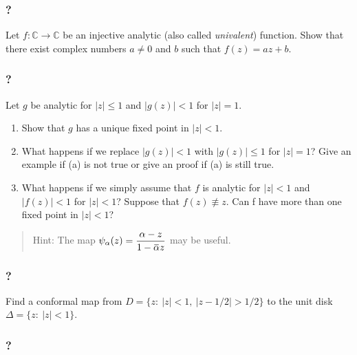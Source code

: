 \hypertarget{section-96}{%
\subsubsection{?}\label{section-96}}

Let \(f: {\mathbb C} \rightarrow {\mathbb C}\) be an injective analytic
(also called \emph{univalent}) function. Show that there exist complex
numbers \(a \neq 0\) and \(b\) such that \(f(z) = az + b\).

\hypertarget{section-97}{%
\subsubsection{?}\label{section-97}}

Let \(g\) be analytic for \(|z|\leq 1\) and \(|g(z)| < 1\) for
\(|z| = 1\).

\begin{enumerate}
\def\labelenumi{\arabic{enumi}.}
\item
  Show that \(g\) has a unique fixed point in \(|z| < 1\).
\item
  What happens if we replace \(|g(z)| < 1\) with \(|g(z)|\leq 1\) for
  \(|z|=1\)? Give an example if (a) is not true or give an proof if (a)
  is still true.
\item
  What happens if we simply assume that \(f\) is analytic for
  \(|z| < 1\) and \(|f(z)| < 1\) for \(|z| < 1\)? Suppose that
  \(f(z) \not\equiv z\). Can f have more than one fixed point in
  \(|z| < 1\)?
\end{enumerate}

\begin{quote}
Hint: The map
\(\displaystyle{\psi_{\alpha}(z)=\frac{\alpha-z}{1-\mkern 1.5mu\overline{\mkern-1.5mu\alpha\mkern-1.5mu}\mkern 1.5muz}}\)
may be useful.
\end{quote}

\hypertarget{section-98}{%
\subsubsection{?}\label{section-98}}

Find a conformal map from \(D = \{z :\  |z| < 1,\ |z - 1/2| > 1/2\}\) to
the unit disk \(\Delta=\{z: \ |z|<1\}\).

\hypertarget{section-99}{%
\subsubsection{?}\label{section-99}}

